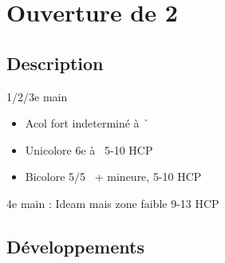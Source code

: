 \documentclass[a4paper]{article}
\begin{document}
\section{Ouverture de 2\pdfh}

\subsection{Description}

1/2/3e main

\begin{itemize}
\item Acol fort indeterminé à \h\ 

\item Unicolore 6e à \s\ 5-10 HCP 

\item Bicolore 5/5 \s\ + mineure, 5-10 HCP

\end{itemize}

\begin{bidtable}
4e \> main : Ideam mais zone faible 9-13 HCP
\end{bidtable}

\subsection{Développements}
\end{document}
